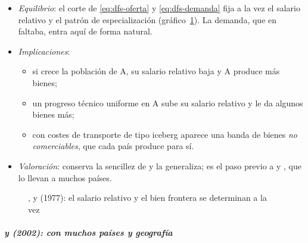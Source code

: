\documentclass[11pt]{article}
\begin{document}
\begin{itemize}
  creciente en $\tilde z$: si A produce más bienes, se demanda más su trabajo.
\item \emph{Equilibrio}: el corte de \eqref{eq:dfs-oferta} y \eqref{eq:dfs-demanda} fija a la vez el salario relativo y el patrón de especialización (gráfico~\ref{fig:dfs}). La demanda, que en  faltaba, entra aquí de forma natural.
\item \emph{Implicaciones}:
  \begin{itemize}
  \item si crece la población de A, su salario relativo baja y A produce más bienes;
  \item un progreso técnico uniforme en A sube su salario relativo y le da algunos bienes más;
  \item con costes de transporte de tipo iceberg aparece una banda de bienes \emph{no comerciables}, que cada país produce para sí.
  \end{itemize}
\item \emph{Valoración}: conserva la sencillez de  y la generaliza; es el paso previo a  y , que lo llevan a muchos países.
\end{itemize}
\begin{figure}[H]
\centering
\caption{,  y  (1977): el salario relativo y el bien frontera se determinan a la vez}\label{fig:dfs}
\end{figure}

\subparagraph{ y  (2002):  con muchos países y geografía}
\end{document}
